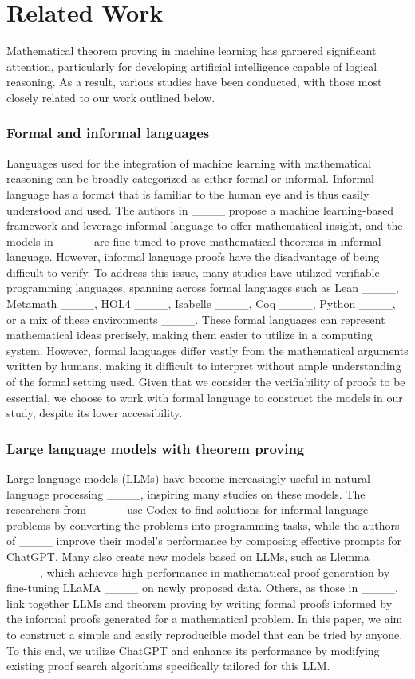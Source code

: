 \section{Related Work}
Mathematical theorem proving in machine learning has garnered significant attention, particularly for developing artificial intelligence capable of logical reasoning. As a result, various studies have been conducted, with those most closely related to our work outlined below.

\subsubsection{Formal and informal languages}

Languages used for the integration of machine learning with mathematical reasoning can be broadly categorized as either formal or informal.
Informal language has a format that is familiar to the human eye and is thus easily understood and used. 
The authors in ____ propose a machine learning-based framework and leverage informal language to offer mathematical insight, and the models in ____ are fine-tuned to prove mathematical theorems in informal language. 
However, informal language proofs have the disadvantage of being difficult to verify. To address this issue, many studies have utilized verifiable programming languages, spanning across formal languages such as Lean ____, Metamath ____, HOL4 ____, Isabelle ____, Coq ____, Python ____, or a mix of these environments ____. 
These formal languages can represent mathematical ideas precisely, making them easier to utilize in a computing system. However, formal languages differ vastly from the mathematical arguments written by humans, making it difficult to interpret without ample understanding of the formal setting used. Given that we consider the verifiability of proofs to be essential, we choose to work with formal language to construct the models in our study, despite its lower accessibility.

\subsubsection{Large language models with theorem proving}
Large language models (LLMs) have become increasingly useful in natural language processing ____, inspiring many studies on these models.
The researchers from ____ use Codex to find solutions for informal language problems by converting the problems into programming tasks, while the authors of ____ improve their model's performance by composing effective prompts for ChatGPT.
Many also create new models based on LLMs, such as Llemma ____, which achieves high performance in mathematical proof generation by fine-tuning LLaMA ____ on newly proposed data.
Others, as those in ____, link together LLMs and theorem proving by writing formal proofs informed by the informal proofs generated for a mathematical problem.
In this paper, we aim to construct a simple and easily reproducible model that can be tried by anyone.
To this end, we utilize ChatGPT and enhance its performance by modifying existing proof search algorithms specifically tailored for this LLM.

